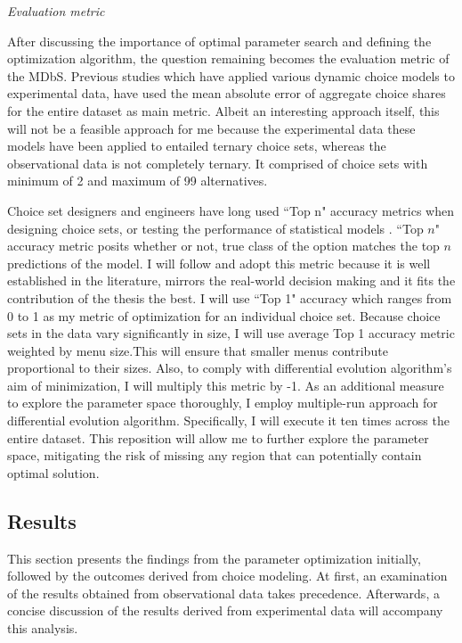 \documentclass[a4paper,12pt]{article}
\begin{document}
\textit{Evaluation metric}

After discussing the importance of optimal parameter search and defining the optimization algorithm, the question remaining becomes the evaluation metric of the MDbS. Previous studies which have applied various dynamic choice models to experimental data, have used the mean absolute error of aggregate choice shares for the entire dataset as main metric. Albeit an interesting approach itself, this will not be a feasible approach for me because the experimental data these models have been applied to entailed ternary choice sets, whereas the observational data is not completely ternary. It comprised of choice sets with minimum of 2 and maximum of 99 alternatives. 

Choice set designers and engineers have long used ``Top n" accuracy metrics when designing choice sets, or testing the performance of statistical models \citep{ricci2015recommender}. ``Top $n$" accuracy metric posits whether or not, true class of the option matches the top $n$ predictions of the model. I will follow and adopt this metric because it is well established in the literature, mirrors the real-world decision making and it fits the contribution of the thesis the best. I will use ``Top 1" accuracy which ranges from 0 to 1 as my metric of optimization for an individual choice set. Because choice sets in the data vary significantly in size, I will use average Top 1 accuracy metric weighted by menu size.This will ensure that smaller menus contribute proportional to their sizes. Also, to comply with differential evolution algorithm's aim of minimization, I will multiply this metric by -1. As an additional measure to explore the parameter space thoroughly, I employ multiple-run approach for differential evolution algorithm. Specifically, I will execute it ten times across the entire dataset. This reposition will allow me to further explore the parameter space, mitigating the risk of missing any region that can potentially contain optimal solution.


\subsection{Results}

This section presents the findings from the parameter optimization initially, followed by the outcomes derived from choice modeling. At first, an examination of the results obtained from observational data takes precedence. Afterwards, a concise discussion of the results derived from experimental data will accompany this analysis.
\end{document}
